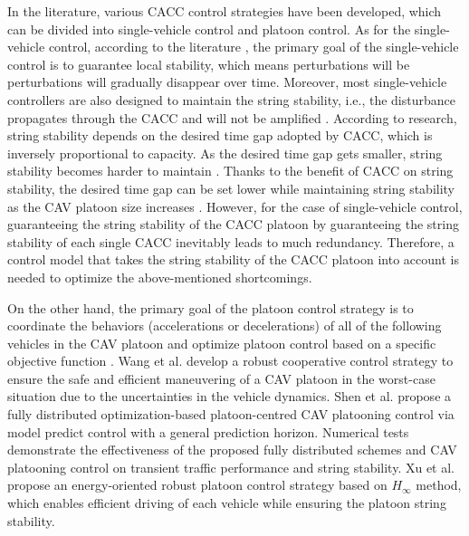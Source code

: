 \documentclass[trsc,nonblindrev]{informs3} %
\begin{document}
In the literature, various CACC control strategies have been developed, which can be divided into single-vehicle control and platoon control. As for the single-vehicle control, according to the literature \citep{qin2018stability,ruan2021stability}, the primary goal of the single-vehicle control is to guarantee local stability, which means perturbations will be perturbations will gradually disappear over time. Moreover, most single-vehicle controllers are also designed to maintain the string stability, i.e., the disturbance propagates through the CACC and will not be amplified \citep{wang2018infrastructure,sun2018stability,ploeg2013lp}. According to research, string stability depends on the desired time gap adopted by CACC, which is inversely proportional to capacity. As the desired time gap gets smaller, string stability becomes harder to maintain \citep{navas2016using}. Thanks to the benefit of CACC on string stability, the desired time gap can be set lower while maintaining string stability as the CAV platoon size increases \citep{Qin2021b}. However, for the case of single-vehicle control, guaranteeing the string stability of the CACC platoon by guaranteeing the string stability of each single CACC inevitably leads to much redundancy. Therefore, a control model that takes the string stability of the CACC platoon into account is needed to optimize the above-mentioned shortcomings.

On the other hand, the primary goal of the platoon control strategy is to coordinate the behaviors (accelerations or decelerations) of all of the following vehicles in the CAV platoon and optimize platoon control based on a specific objective function \citep{Wang2022a,Shen2021,Xu2019a}. Wang et al. \citep{Wang2022a} develop a robust cooperative control strategy to ensure the safe and efficient maneuvering of a CAV platoon in the worst-case situation due to the uncertainties in the vehicle dynamics. Shen et al. \citep{Shen2021} propose a fully distributed optimization-based platoon-centred CAV platooning control via model predict control with a general prediction horizon. Numerical tests demonstrate the effectiveness of the proposed fully distributed schemes and CAV platooning control on transient traffic performance and string stability. Xu et al. \citep{Xu2019a} propose an energy-oriented robust platoon control strategy based on $H_{\infty}$ method, which enables efficient driving of each vehicle while ensuring the platoon string stability.
\end{document}
